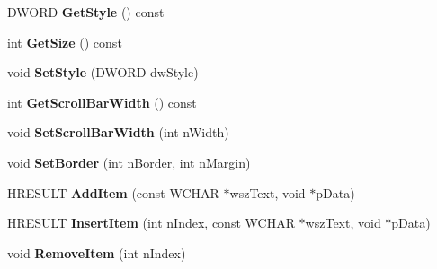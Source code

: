 \begin{DoxyCompactItemize}
\item 
\hypertarget{class_c_d_x_u_t_list_box_a11e88f4e848a524086c1f1f7767ef1f2}{D\+W\+O\+R\+D {\bfseries Get\+Style} () const }\label{class_c_d_x_u_t_list_box_a11e88f4e848a524086c1f1f7767ef1f2}

\item 
\hypertarget{class_c_d_x_u_t_list_box_ac29427369066a473e35fb33795275e15}{int {\bfseries Get\+Size} () const }\label{class_c_d_x_u_t_list_box_ac29427369066a473e35fb33795275e15}

\item 
\hypertarget{class_c_d_x_u_t_list_box_aabaa331fd9dfac04ba655a369d1cef0e}{void {\bfseries Set\+Style} (D\+W\+O\+R\+D dw\+Style)}\label{class_c_d_x_u_t_list_box_aabaa331fd9dfac04ba655a369d1cef0e}

\item 
\hypertarget{class_c_d_x_u_t_list_box_a17fcbaece1316f5de54868bdb468fe6f}{int {\bfseries Get\+Scroll\+Bar\+Width} () const }\label{class_c_d_x_u_t_list_box_a17fcbaece1316f5de54868bdb468fe6f}

\item 
\hypertarget{class_c_d_x_u_t_list_box_a21b4a1c70d8b5fc213760927b9ae5c1d}{void {\bfseries Set\+Scroll\+Bar\+Width} (int n\+Width)}\label{class_c_d_x_u_t_list_box_a21b4a1c70d8b5fc213760927b9ae5c1d}

\item 
\hypertarget{class_c_d_x_u_t_list_box_a9886ec7b003a9c218a6b5684d3cc0530}{void {\bfseries Set\+Border} (int n\+Border, int n\+Margin)}\label{class_c_d_x_u_t_list_box_a9886ec7b003a9c218a6b5684d3cc0530}

\item 
\hypertarget{class_c_d_x_u_t_list_box_aa51de5a656dcaf651fb0d9da497c15f0}{H\+R\+E\+S\+U\+L\+T {\bfseries Add\+Item} (const W\+C\+H\+A\+R $\ast$wsz\+Text, void $\ast$p\+Data)}\label{class_c_d_x_u_t_list_box_aa51de5a656dcaf651fb0d9da497c15f0}

\item 
\hypertarget{class_c_d_x_u_t_list_box_a894dfd0e0df7a8ce39268f067f5d5d06}{H\+R\+E\+S\+U\+L\+T {\bfseries Insert\+Item} (int n\+Index, const W\+C\+H\+A\+R $\ast$wsz\+Text, void $\ast$p\+Data)}\label{class_c_d_x_u_t_list_box_a894dfd0e0df7a8ce39268f067f5d5d06}

\item 
\hypertarget{class_c_d_x_u_t_list_box_a711aeffe979787d579b446ef8f1f47da}{void {\bfseries Remove\+Item} (int n\+Index)}\label{class_c_d_x_u_t_list_box_a711aeffe979787d579b446ef8f1f47da}


\end{DoxyCompactItemize}
